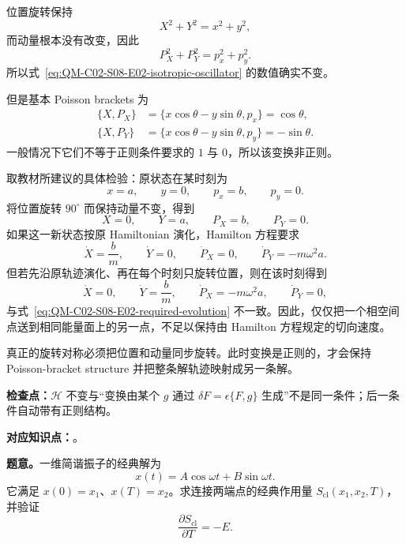 \begin{checkedsolution}
位置旋转保持
\[
  X^2+Y^2=x^2+y^2,
\]
而动量根本没有改变，因此
\[
  P_X^2+P_Y^2=p_x^2+p_y^2.
\]
所以式~\eqref{eq:QM-C02-S08-E02-isotropic-oscillator} 的数值确实不变。

但是基本 Poisson brackets 为
\begin{align}
  \{X,P_X\}
  &=\{x\cos\theta-y\sin\theta,p_x\}
  =\cos\theta,
  \label{eq:QM-C02-S08-E02-x-px-bracket}\\
  \{X,P_Y\}
  &=\{x\cos\theta-y\sin\theta,p_y\}
  =-\sin\theta.
  \label{eq:QM-C02-S08-E02-x-py-bracket}
\end{align}
一般情况下它们不等于正则条件要求的 $1$ 与 $0$，所以该变换非正则。

取教材所建议的具体检验：原状态在某时刻为
\[
  x=a,
  \qquad
  y=0,
  \qquad
  p_x=b,
  \qquad
  p_y=0.
\]
将位置旋转 $90^\circ$ 而保持动量不变，得到
\[
  X=0,
  \qquad
  Y=a,
  \qquad
  P_X=b,
  \qquad
  P_Y=0.
\]
如果这一新状态按原 Hamiltonian 演化，Hamilton 方程要求
\begin{equation}
  \dot X=\frac bm,
  \qquad
  \dot Y=0,
  \qquad
  \dot P_X=0,
  \qquad
  \dot P_Y=-m\omega^2a.
  \label{eq:QM-C02-S08-E02-required-evolution}
\end{equation}
但若先沿原轨迹演化、再在每个时刻只旋转位置，则在该时刻得到
\begin{equation}
  \dot X=0,
  \qquad
  \dot Y=\frac bm,
  \qquad
  \dot P_X=-m\omega^2a,
  \qquad
  \dot P_Y=0,
  \label{eq:QM-C02-S08-E02-transformed-evolution}
\end{equation}
与式~\eqref{eq:QM-C02-S08-E02-required-evolution} 不一致。因此，仅仅把一个相空间点送到相同能量面上的另一点，不足以保持由 Hamilton 方程规定的切向速度。

真正的旋转对称必须把位置和动量同步旋转。此时变换是正则的，才会保持 Poisson-bracket structure 并把整条解轨迹映射成另一条解。
\end{checkedsolution}

\textbf{检查点：}$\mathcal H$ 不变与“变换由某个 $g$ 通过 $\delta F=\epsilon\{F,g\}$ 生成”不是同一条件；后一条件自动带有正则结构。


\textbf{对应知识点：}。

\textbf{题意。}一维简谐振子的经典解为
\[
  x(t)=A\cos\omega t+B\sin\omega t.
\]
它满足 $x(0)=x_1$、$x(T)=x_2$。求连接两端点的经典作用量 $S_{\mathrm{cl}}(x_1,x_2,T)$，并验证
\[
  \frac{\partial S_{\mathrm{cl}}}{\partial T}=-E.
\]

